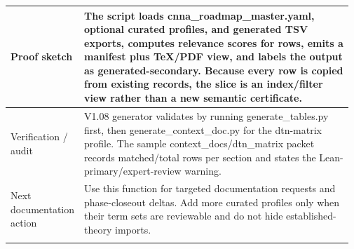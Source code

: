 \begin{longtable}{L{0.16\linewidth} L{0.81\linewidth}}
\hline\addlinespace[0.20em]
Proof sketch & The script loads cnna\_roadmap\_master.yaml, optional curated profiles, and generated TSV exports, computes relevance scores for rows, emits a manifest plus TeX/\allowbreak{}PDF view, and labels the output as generated-secondary. Because every row is copied from existing records, the slice is an index/\allowbreak{}filter view rather than a new semantic certificate.\\
\hline\addlinespace[0.20em]
Verification /\allowbreak{} audit & V1.08 generator validates by running generate\_tables.py first, then generate\_context\_doc.py for the dtn-matrix profile. The sample context\_docs/\allowbreak{}dtn\_matrix packet records matched/\allowbreak{}total rows per section and states the Lean-primary/\allowbreak{}expert-review warning.\\
\hline\addlinespace[0.20em]
Next documentation action & Use this function for targeted documentation requests and phase-closeout deltas. Add more curated profiles only when their term sets are reviewable and do not hide established-theory imports.\\
\hline\addlinespace[0.20em]
\end{longtable}
